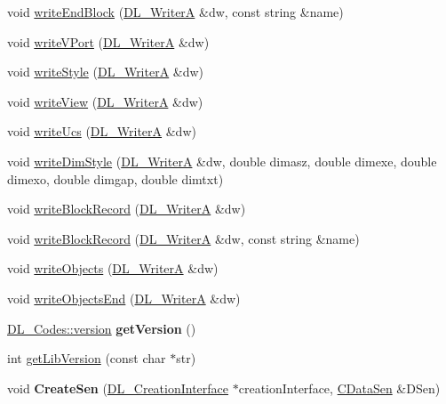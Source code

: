 \begin{DoxyCompactItemize}
\item 
void \hyperlink{classDL__Jww_a44ae7ddbcab7865514e8f04863887b42}{write\-End\-Block} (\hyperlink{classDL__WriterA}{D\-L\-\_\-\-Writer\-A} \&dw, const string \&name)
\item 
void \hyperlink{classDL__Jww_a83d80c0542a39fe60fcc6281a6ad1e64}{write\-V\-Port} (\hyperlink{classDL__WriterA}{D\-L\-\_\-\-Writer\-A} \&dw)
\item 
void \hyperlink{classDL__Jww_aebc0e1fc77e63d17707887660bf0b334}{write\-Style} (\hyperlink{classDL__WriterA}{D\-L\-\_\-\-Writer\-A} \&dw)
\item 
void \hyperlink{classDL__Jww_a253faff9517a165071932dc688853b55}{write\-View} (\hyperlink{classDL__WriterA}{D\-L\-\_\-\-Writer\-A} \&dw)
\item 
void \hyperlink{classDL__Jww_a504de91e55fc8b897fa177e14ff96a5f}{write\-Ucs} (\hyperlink{classDL__WriterA}{D\-L\-\_\-\-Writer\-A} \&dw)
\item 
void \hyperlink{classDL__Jww_a32ddda913f2538ce26eeeb9648f3ec7a}{write\-Dim\-Style} (\hyperlink{classDL__WriterA}{D\-L\-\_\-\-Writer\-A} \&dw, double dimasz, double dimexe, double dimexo, double dimgap, double dimtxt)
\item 
void \hyperlink{classDL__Jww_a2d131ed835cf3a6872b0486edcaf2f28}{write\-Block\-Record} (\hyperlink{classDL__WriterA}{D\-L\-\_\-\-Writer\-A} \&dw)
\item 
void \hyperlink{classDL__Jww_aae6742d43025466554cfd047da56b567}{write\-Block\-Record} (\hyperlink{classDL__WriterA}{D\-L\-\_\-\-Writer\-A} \&dw, const string \&name)
\item 
void \hyperlink{classDL__Jww_a08f2617820707ce3ea4a6b2b5b8cb458}{write\-Objects} (\hyperlink{classDL__WriterA}{D\-L\-\_\-\-Writer\-A} \&dw)
\item 
void \hyperlink{classDL__Jww_ad9204c6bfce1ac6eff07cd66ca215510}{write\-Objects\-End} (\hyperlink{classDL__WriterA}{D\-L\-\_\-\-Writer\-A} \&dw)
\item 
\hypertarget{classDL__Jww_a5210a8f7c70f6898bc8e6050a932ea18}{\hyperlink{classDL__Codes_a5eba107e2d280c70b52ffab0292fb9dc}{D\-L\-\_\-\-Codes\-::version} {\bfseries get\-Version} ()}\label{classDL__Jww_a5210a8f7c70f6898bc8e6050a932ea18}

\item 
int \hyperlink{classDL__Jww_a08cfa285f902c87a45c8beed373a8d2b}{get\-Lib\-Version} (const char $\ast$str)
\item 
\hypertarget{classDL__Jww_a18f35c0bb73abd04501c70642c7653fd}{void {\bfseries Create\-Sen} (\hyperlink{classDL__CreationInterface}{D\-L\-\_\-\-Creation\-Interface} $\ast$creation\-Interface, \hyperlink{classCDataSen}{C\-Data\-Sen} \&D\-Sen)}\label{classDL__Jww_a18f35c0bb73abd04501c70642c7653fd}


\end{DoxyCompactItemize}
